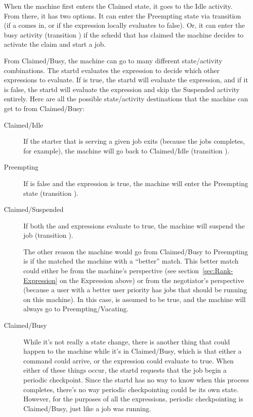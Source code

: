 When the machine first enters the Claimed state, it goes to the Idle
activity.  From there, it has two options.  
It can enter the Preempting state via transition  (if a 
 comes in, or if the  expression locally
evaluates to false).  
Or, it can enter the busy activity (transition ) if the
schedd that has claimed the machine decides to activate the claim and
start a job.

From Claimed/Busy, the machine can go to many different state/activity
combinations.
The startd evaluates the  expression to decide
which other expressions to evaluate.  
If  is true, the startd will evaluate the
 expression, and if it is false, the startd will
evaluate the  expression and skip the Suspended activity
entirely.
Here are all the possible state/activity destinations that the
machine can get to from Claimed/Busy:

\begin{description}
  
\item[Claimed/Idle] If the starter that is serving a given job exits
  (because the jobs completes, for example), the machine will go back
  to Claimed/Idle (transition ).
  
\item[Preempting] If  is false and the
   expression is true, the machine will enter the
  Preempting state (transition ).
  
\item[Claimed/Suspended] If both the  and
   expressions evaluate to true, the machine will
  suspend the job (transition ).
  
  The other reason the machine would go from Claimed/Busy to
  Preempting is if the  matched the machine
  with a ``better'' match.  This better match could either be from the
  machine's perspective (see section~\ref{sec:Rank-Expression} on the
   Expression above) or from the negotiator's perspective
  (because a user with a better user priority has jobs that should be
  running on this machine).
  In this case,  is assumed to be true, and the
  machine will always go to Preempting/Vacating.
  
\item[Claimed/Busy] While it's not really a state change, there is
  another thing that could happen to the machine while it's in
  Claimed/Busy, which is that either a  command
  could arrive, or the  expression could
  evaluate to true.  When either of these things occur, the startd
  requests that the job begin a periodic checkpoint.  Since the startd
  has no way to know when this process completes, there's no way
  periodic checkpointing could be its own state.  However, for the
  purposes of all the expressions, periodic checkpointing is
  Claimed/Busy, just like a job was running.

\end{description}

